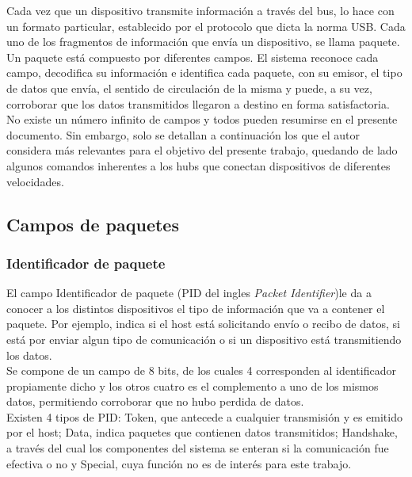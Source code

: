 Cada vez que un dispositivo transmite información a través del bus, lo hace con un formato particular, establecido por el protocolo que dicta la norma USB. Cada uno de los fragmentos de información que envía un dispositivo, se llama paquete.\\

Un paquete está compuesto por diferentes campos. El sistema reconoce cada campo, decodifica su información e identifica cada paquete, con su emisor, el tipo de datos que envía, el sentido de circulación de la misma y puede, a su vez, corroborar que los datos transmitidos llegaron a destino en forma satisfactoria.\\

No existe un número infinito de campos y todos pueden resumirse en el presente documento. Sin embargo, solo se detallan a continuación los que el autor considera más relevantes para el objetivo del presente trabajo, quedando de lado algunos comandos inherentes a los hubs que conectan dispositivos de diferentes velocidades.\\

\subsection{Campos de paquetes}

	\subsubsection*{Identificador de paquete}
		El campo Identificador de paquete (PID del ingles {\it Packet Identifier})le da a conocer a los distintos dispositivos el tipo de información que va a contener el paquete. Por ejemplo, indica si el host está solicitando envío o recibo de datos, si está por enviar algun tipo de comunicación o si un dispositivo está transmitiendo los datos.\\
	
		Se compone de un campo de 8 bits, de los cuales 4 corresponden al identificador propiamente dicho y los otros cuatro es el complemento a uno de los mismos datos, permitiendo corroborar que no hubo perdida de datos.\\
		
		Existen 4 tipos de PID: Token, que antecede a cualquier transmisión y es emitido por el host; Data, indica paquetes que contienen datos transmitidos; Handshake, a través del cual los componentes del sistema se enteran si la comunicación fue efectiva o no y Special, cuya función no es de interés para este trabajo.\\
	
